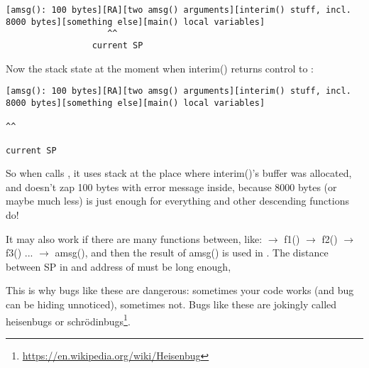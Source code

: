 \begin{lstlisting}
[amsg(): 100 bytes][RA][two amsg() arguments][interim() stuff, incl. 8000 bytes][something else][main() local variables]
                    ^^
                 current SP
\end{lstlisting}

Now the stack state at the moment when interim() returns control to \main{}:

\begin{lstlisting}
[amsg(): 100 bytes][RA][two amsg() arguments][interim() stuff, incl. 8000 bytes][something else][main() local variables]
                                                                                        ^^
                                                                                     current SP
\end{lstlisting}

So when \main calls \printf, it uses stack at the place where interim()'s buffer was allocated,
and doesn't zap 100 bytes with error message inside, because 8000 bytes (or maybe much less) is just enough for everything
\printf and other descending functions do!

It may also work if there are many functions between, like:
\main $\rightarrow$ f1() $\rightarrow$ f2() $\rightarrow$ f3() ... $\rightarrow$ amsg(),
and then the result of amsg() is used in \main.
The distance between \ac{SP} in \main and address of \TT{buf[]} must be long enough,

This is why bugs like these are dangerous: sometimes your code works (and bug can be hiding unnoticed), sometimes not.
\label{heisenbug}
\myindex{Heisenbug}
Bugs like these are jokingly called heisenbugs or schrödinbugs\footnote{\url{https://en.wikipedia.org/wiki/Heisenbug}}.

